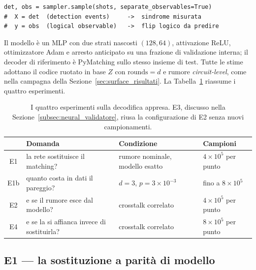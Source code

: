 \begin{lstlisting}[caption={Il dataset del decoder appreso coincide con l'output del campionatore di Stim: \texttt{det} è la sindrome osservata, \texttt{obs} l'esito logico da predire. Il decoder analitico e quello appreso ricevono quindi esattamente la stessa informazione.}, label={lst:neural_dataset}]
det, obs = sampler.sample(shots, separate_observables=True)
#  X = det  (detection events)     ->  sindrome misurata
#  y = obs  (logical observable)   ->  flip logico da predire
\end{lstlisting}

Il modello è un \ac{MLP} con due strati nascosti $(128, 64)$, attivazione ReLU, ottimizzatore Adam e arresto anticipato su una frazione di validazione interna; il decoder di riferimento è PyMatching sullo stesso insieme di test. Tutte le stime adottano il codice ruotato in base $Z$ con $\text{rounds}=d$ e rumore \textit{circuit-level}, come nella campagna della Sezione~\ref{sec:surface_risultati}. La Tabella~\ref{tab:neural_disegno} riassume i quattro esperimenti.

\begin{table}[H]
\centering
\small
\begin{tabularx}{\textwidth}{cXXX}
\toprule
& \textbf{Domanda} & \textbf{Condizione} & \textbf{Campioni} \\
\midrule
E1  & la rete sostituisce il matching?      & rumore nominale, modello esatto & $4\times10^5$ per punto \\
E1b & quanto costa in dati il pareggio?     & $d=3$, $p=3\times10^{-3}$        & fino a $8\times10^5$ \\
E2  & e se il rumore esce dal modello?      & crosstalk correlato              & $4\times10^5$ per punto \\
E4  & e se la si affianca invece di sostituirla? & crosstalk correlato         & $8\times10^5$ per punto \\
\bottomrule
\end{tabularx}
\caption[Disegno sperimentale della decodifica appresa]{I quattro esperimenti sulla decodifica appresa. E3, discusso nella Sezione~\ref{subsec:neural_validatore}, riusa la configurazione di E2 senza nuovi campionamenti.}
\label{tab:neural_disegno}
\end{table}

\subsection{E1 --- la sostituzione a parità di modello}
\label{subsec:neural_e1}

